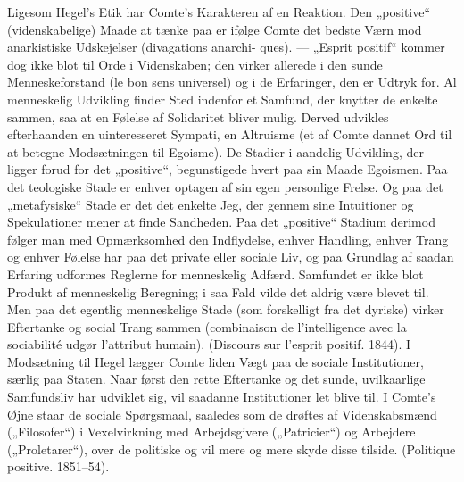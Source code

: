 \documentclass[12pt,a4paper,openany]{book}
\newcommand{\opage}[1]{\marginnote{\footnotesize\textit{[#1]}}}
\begin{document}
Ligesom Hegel’s Etik har Comte’s Karakteren af en Reaktion. Den
„positive“ (videnskabelige) Maade at tænke paa er ifølge Comte det
bedste Værn mod anarkistiske Udskejelser (divagations anarchi-
ques). --- „Esprit positif“ kommer dog ikke blot til Orde i Videnskaben;
den virker allerede i den sunde Menneskeforstand (le bon
sens universel) og i de Erfaringer, den er Udtryk for. Al menneskelig
Udvikling finder Sted indenfor et Samfund, der knytter de enkelte
sammen, saa at en Følelse af Solidaritet bliver mulig. Derved
udvikles efterhaanden en uinteresseret Sympati, en Altruisme (et af
Comte dannet Ord til at betegne Modsætningen til Egoisme). De
Stadier i aandelig Udvikling, der ligger forud for det „positive“, begunstigede
hvert paa sin Maade Egoismen. Paa det teologiske Stade
er enhver optagen af sin egen personlige Frelse. Og paa det „metafysiske“
Stade er det det enkelte Jeg, der gennem sine Intuitioner og
\opage{69}Spekulationer mener at finde Sandheden. Paa det „positive“ Stadium
derimod følger man med Opmærksomhed den Indflydelse,
enhver Handling, enhver Trang og enhver Følelse har paa det private
eller sociale Liv, og paa Grundlag af saadan Erfaring udformes
Reglerne for menneskelig Adfærd. Samfundet er ikke blot Produkt
af menneskelig Beregning; i saa Fald vilde det aldrig være blevet til.
Men paa det egentlig menneskelige Stade (som forskelligt fra det dyriske)
virker Eftertanke og social Trang sammen (combinaison de
l’intelligence avec la sociabilité udgør l’attribut humain). (Discours
sur l’esprit positif. 1844). I Modsætning til Hegel lægger Comte liden
Vægt paa de sociale Institutioner, særlig paa Staten. Naar først den
rette Eftertanke og det sunde, uvilkaarlige Samfundsliv har udviklet
sig, vil saadanne Institutioner let blive til. I Comte’s Øjne staar de
sociale Spørgsmaal, saaledes som de drøftes af Videnskabsmænd
(„Filosofer“) i Vexelvirkning med Arbejdsgivere („Patricier“) og
Arbejdere („Proletarer“), over de politiske og vil mere og mere skyde
disse tilside. (Politique positive. 1851–54).
\end{document}
